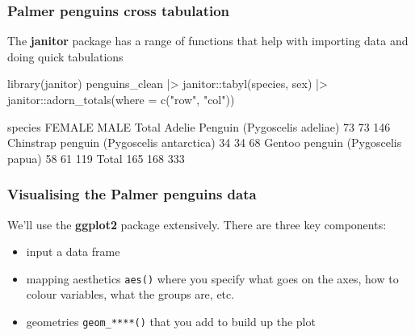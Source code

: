 \documentclass[a4paper]{article}\usepackage[]{graphicx}\usepackage[]{xcolor}
\begin{document}
\subsubsection{Palmer penguins cross tabulation}
The \textbf{janitor} package has a range of functions that help with importing data and doing quick tabulations
\begin{Schunk}
\begin{Sinput}
library(janitor)
penguins_clean |>
  janitor::tabyl(species, sex) |>
  janitor::adorn_totals(where = c("row", "col"))
\end{Sinput}
\begin{Soutput}
                                   species FEMALE MALE Total
       Adelie Penguin (Pygoscelis adeliae)     73   73   146
 Chinstrap penguin (Pygoscelis antarctica)     34   34    68
         Gentoo penguin (Pygoscelis papua)     58   61   119
                                     Total    165  168   333
\end{Soutput}
\end{Schunk}
\subsubsection{Visualising the Palmer penguins data}
We'll use the \textbf{ggplot2} package extensively. There are three key components:
\begin{itemize}
  	\item input a data frame
	\item mapping aesthetics \lstinline|aes()| where you specify what goes on the axes, how to
	colour variables, what the groups are, etc.
	\item geometries \lstinline|geom_****()| that you add to build up the plot
\end{itemize}
\end{document}
